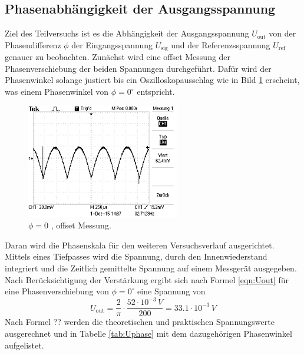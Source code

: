 \subsection{Phasenabhängigkeit der Ausgangsspannung}
Ziel des Teilversuchs ist es die Abhängigkeit der Ausgangsspannung $U_{\text{out}}$ von der Phasendifferenz $\phi$ der Eingangsspannung $U_{\text{sig}}$ und der Referenzsspannung $U_{\text{ref}}$ genauer zu beobachten. Zunächst wird eine offset Messung der Phasenverschiebung der beiden Spannungen durchgeführt. Dafür wird der Phasenwinkel solange justiert bis ein Oszilloskopausschlag wie in Bild \ref{fig:phi0} erscheint, was einem Phasenwinkel von $\phi = 0^{\circ}$ entspricht.
\begin{figure}
  \centering
  \includegraphics[height=5cm]{picture/1.JPG}
  \caption{$\phi = 0$ , offset Messung.}
  \label{fig:phi0}
\end{figure}
Daran wird die Phasenskala für den weiteren Versuchsverlauf ausgerichtet. Mittels eines Tiefpasses wird die Spannung, durch den Innenwiederstand integriert und die Zeitlich gemittelte Spannung auf einem Messgerät ausgegeben. Nach Berücksichtigung der Verstärkung ergibt sich nach Formel \ref{eqn:Uout} für eine Phasenverschiebung von $\phi = 0^{\circ}$ eine Spannung von
\begin{equation}
  U_{\text{out}} = \frac{2}{\pi} \cdot \frac{52 \cdot 10^{-3} \, V}{200} = 33.1 \cdot 10^{-3} \, V
  \label{eqn:Uout}
\end{equation}
Nach Formel ?? werden die theoretischen und praktischen Spannungswerte ausgerechnet und in Tabelle \ref{tab:Uphase} mit dem dazugehörigen Phasenwinkel aufgelistet.
